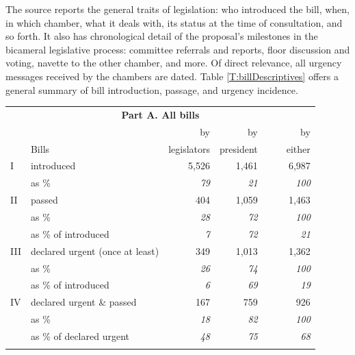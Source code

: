 \documentclass[letter,12pt]{article}
\begin{document}
The source reports the general traits of legislation: who introduced the bill, when, in which chamber, what it deals with, its status at the time of consultation, and so forth. It also has chronological detail of the proposal's milestones in the bicameral legislative process: committee referrals and reports, floor discussion and voting, navette to the other chamber, and more. Of direct relevance, all urgency messages received by the chambers are dated. Table \ref{T:billDescriptives} offers a general summary of bill introduction, passage, and urgency incidence.

\begin{table}
\centering
\begin{tabular}{llrrr}
\multicolumn{5}{c}{\textbf{Part A. All bills}} \\
   &                                 &  by           &  by          &    by      \\
   & Bills                           &  legislators  &  president   &    ~~~~either  \\ \hline
I  & introduced                      &        5,526  &       1,461  &     6,987  \\
   & as \%                           &    \emph{79}  &   \emph{21}  & \emph{100} \\ \hdashline
II & passed                          &          404  &       1,059  &     1,463  \\
   & as \%                           &    \emph{28}  &   \emph{72}  & \emph{100} \\
   & as \% of introduced             &     \emph{7}  &   \emph{72}  &  \emph{21} \\ \hdashline
III& declared urgent (once at least) &          349  &       1,013  &     1,362  \\
   & as \%                           &    \emph{26}  &   \emph{74}  & \emph{100} \\
   & as \% of introduced             &     \emph{6}  &   \emph{69}  &  \emph{19} \\ \hdashline
IV & declared urgent \& passed       &          167  &         759  &       926  \\
   & as \%                           &    \emph{18}  &   \emph{82}  & \emph{100} \\
   & as \% of declared urgent        &    \emph{48}  &   \emph{75}  &  \emph{68} \\ \hline
\\

\end{tabular}
\end{table}
\end{document}
